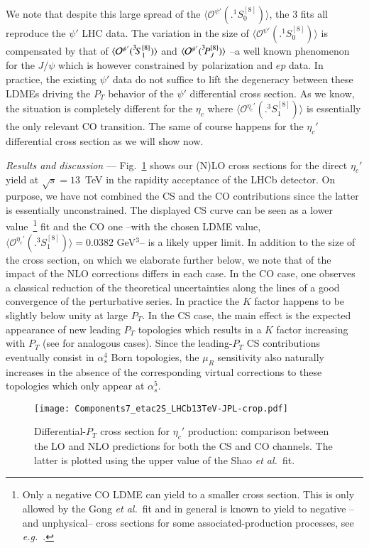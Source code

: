 \documentclass[showpacs,aps,PRL,twocolumn,footinbib,11]{revtex4-1}
\def\eg{{\it e.g.}}
\def\etal{{\it et al.}}
\def\tSoe{{\bigl.^3\!S^{[8]}_1}}
\def\tPJe{{\bigl.^3\!P^{[8]}_J}}
\def\psip{\psi'}
\def\etacp{\eta_c'}
\def\copsip{{\langle\mathcal{O}^{\psip}(\bigl.^1\! S_0^{[8]})\rangle}}
\def\coetacp{{\langle\mathcal{O}^{\etacp}(\bigl.^3\! S_1^{[8]})\rangle}}
\newcommand{\cf}[1]{{Fig.~\ref{#1}}}
\begin{document}
We note that despite this large spread of the $\copsip$,
the 3 fits all reproduce the $\psip$ LHC data. The variation in the size of 
$\copsip$ is compensated by that
of $\langle {\cal O}^{\psip}(\tSoe) \rangle$ and $\langle {\cal O}^{\psip} (\tPJe) \rangle$ --a well known phenomenon for the $J/\psi$ which is however constrained by polarization and $ep$ data.
In practice, the existing $\psip$ data do not suffice to lift the degeneracy between 
these LDMEs driving the $P_T$ behavior of the $\psip$ differential cross section.
As we know, the situation is completely different for the $\eta_c$ where 
$\coetacp$ is essentially the only relevant CO transition.
The same of course happens for the $\etacp$ differential cross section as we will show now.


\textit{Results and discussion} ---  
%
\cf{fig:CO_vs_CS-LO_vs_NLO} shows our (N)LO cross sections for the direct $\etacp$ yield 
at $\sqrt{s}=13$~TeV in the rapidity acceptance of the LHCb detector. On purpose, we
have not combined the CS and the CO contributions since the latter is essentially unconstrained. 
The displayed CS curve can be seen as a lower value~\footnote{Only a negative CO LDME can 
yield to a smaller cross section. This is only allowed by the Gong \etal\ fit and
in general is known to yield to negative --and unphysical-- cross sections for some associated-production processes, 
see \eg\ \cite{Li:2014ava}.} fit and the CO one --with the chosen LDME value, $\coetacp=0.0382$ GeV$^3$--
is a likely upper limit. In addition to the size of the cross section, on which we elaborate further
below, we note that of the impact of the NLO corrections differs in each case. In the CO case, one
observes a classical reduction of the theoretical uncertainties along the lines of a good
convergence of the perturbative series. In practice the $K$ factor happens to be slightly below unity at large $P_T$. 
In the CS case, the main effect is the expected appearance of new leading $P_T$ topologies which results
in a $K$ factor increasing with $P_T$ (see \cite{Artoisenet:2008fc,Lansberg:2008gk,Lansberg:2009db,Gong:2012ah,Lansberg:2013qka} for analogous cases). Since the leading-$P_T$ CS contributions eventually consist in $\alpha_s^4$
Born topologies, the $\mu_R$ sensitivity also naturally increases in the absence
of the corresponding virtual corrections to these topologies which only appear at $\alpha_s^5$. 

\begin{figure}[hbt!]
\centering
\texttt{[image: Components7\_etac2S\_LHCb13TeV-JPL-crop.pdf]}
\caption{Differential-$P_T$ cross section for $\etacp$ production: comparison between
the LO and NLO predictions for both the CS and CO channels. The latter is plotted using the upper
value of the Shao \etal\ fit.}\label{fig:CO_vs_CS-LO_vs_NLO}
\end{figure}
\end{document}
